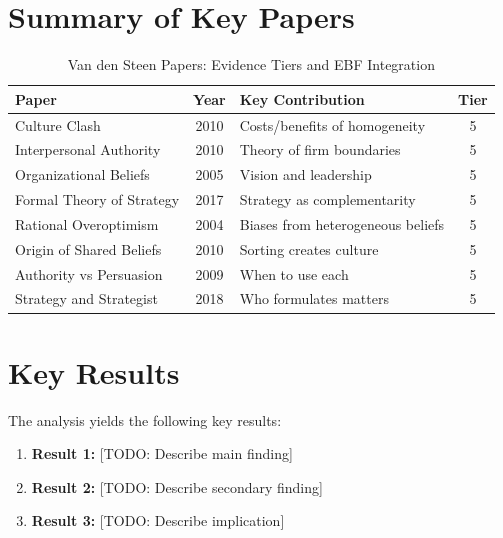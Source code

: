 \section{Summary of Key Papers}

\begin{table}[htbp]
\centering
\caption{Van den Steen Papers: Evidence Tiers and EBF Integration}
\label{tab:vandensteen-papers}
\renewcommand{\arraystretch}{1.2}
\small
\begin{tabular}{@{}p{4cm}cp{5cm}c@{}}
\toprule
\textbf{Paper} & \textbf{Year} & \textbf{Key Contribution} & \textbf{Tier} \\
\midrule
Culture Clash & 2010 & Costs/benefits of homogeneity & 5 \\
Interpersonal Authority & 2010 & Theory of firm boundaries & 5 \\
Organizational Beliefs & 2005 & Vision and leadership & 5 \\
Formal Theory of Strategy & 2017 & Strategy as complementarity & 5 \\
Rational Overoptimism & 2004 & Biases from heterogeneous beliefs & 5 \\
Origin of Shared Beliefs & 2010 & Sorting creates culture & 5 \\
Authority vs Persuasion & 2009 & When to use each & 5 \\
Strategy and Strategist & 2018 & Who formulates matters & 5 \\
\bottomrule
\end{tabular}
\end{table}


\section{Key Results}
\label{sec:results}

The analysis yields the following key results:

\begin{enumerate}
    \item \textbf{Result 1:} [TODO: Describe main finding]
    \item \textbf{Result 2:} [TODO: Describe secondary finding]
    \item \textbf{Result 3:} [TODO: Describe implication]
\end{enumerate}

